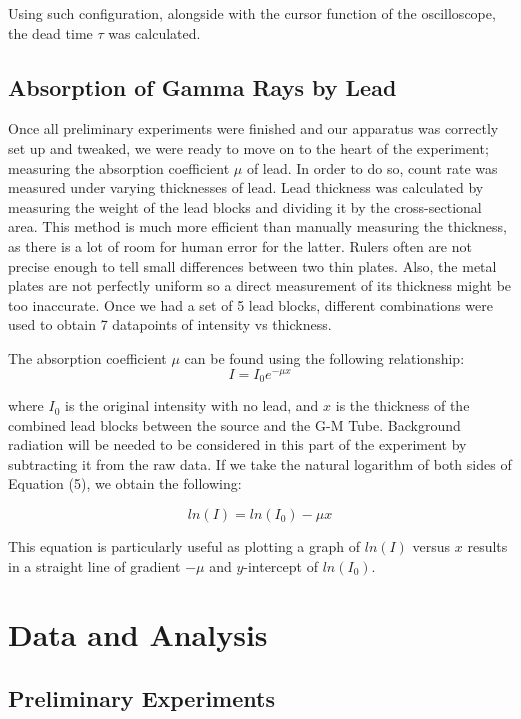 \documentclass[a4paper]{article}
\begin{document}
  Using such configuration, alongside with the cursor function of the oscilloscope, the dead time $\tau$ was calculated.
  
  \subsection{Absorption of Gamma Rays by Lead}
  Once all preliminary experiments were finished and our apparatus was correctly set up and tweaked, we were ready to move on to the heart of the experiment; measuring the absorption coefficient $\mu$ of lead. In order to do so, count rate was measured under varying thicknesses of lead. Lead thickness was calculated by measuring the weight of the lead blocks and dividing it by the cross-sectional area. This method is much more efficient than manually measuring the thickness, as there is a lot of room for human error for the latter. Rulers often are not precise enough to tell small differences between two thin plates. Also, the metal plates are not perfectly uniform so a direct measurement of its thickness might be too inaccurate. Once we had a set of 5 lead blocks, different combinations were used to obtain 7 datapoints of intensity vs thickness.
  
  The absorption coefficient $\mu$ can be found using the following relationship:
  \begin{equation}
  I=I_{0}e^{-\mu x}
  \end{equation}
  
  where $I_0$ is the original intensity with no lead, and $x$ is the thickness of the combined lead blocks between the source and the G-M Tube. Background radiation will be needed to be considered in this part of the experiment by subtracting it from the raw data. If we take the natural logarithm of both sides of Equation (5), we obtain the following:
  
  \begin{equation}
  ln(I)=ln(I_0)-\mu x
  \end{equation}
  
  This equation is particularly useful as plotting a graph of $ln(I)$ versus $x$ results in a straight line of gradient $-\mu$ and $y$-intercept of $ln(I_0)$.
  
 \section{Data and Analysis}
 \subsection{Preliminary Experiments}
\end{document}

